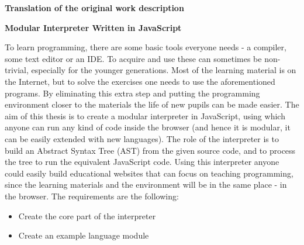 \clearpage
\begin{center}
\large
\textbf{Translation of the original work description}\\
\end{center}

\begin{center}
\Huge
\textbf{Modular Interpreter Written in JavaScript}\\
\end{center}

To learn programming, there are some basic tools everyone needs - a compiler, some text editor or an IDE. To acquire and use these can sometimes be non-trivial, especially for the younger generations. Most of the learning material is on the Internet, but to solve the exercises one needs to use the aforementioned programs. By eliminating this extra step and putting the programming environment closer to the materials the life of new pupils can be made easier. The aim of this thesis is to create a modular interpreter in JavaScript, using which anyone can run any kind of code inside the browser (and hence it is modular, it can be easily extended with new languages). The role of the interpreter is to build an Abstract Syntax Tree (AST) from the given source code, and to process the tree to run the equivalent JavaScript code. Using this interpreter anyone could easily build educational websites that can focus on teaching programming, since the learning materials and the environment will be in the same place - in the browser.
The requirements are the following:
\begin{itemize}
\item Create the core part of the interpreter
\item Create an example language module
\end{itemize}